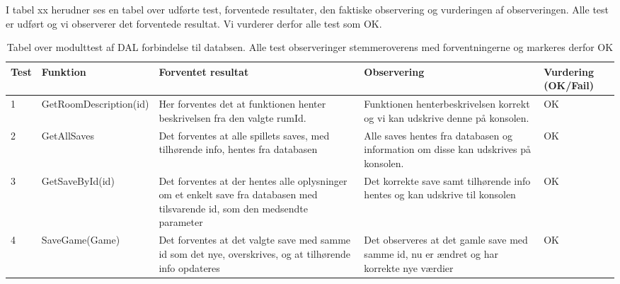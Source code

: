 I tabel xx herudner ses en tabel over udførte test, forventede resultater, den faktiske observering og vurderingen af observeringen.
Alle test er udført og vi observerer det forventede resultat. Vi vurderer derfor alle test som OK.

\begin{table}[H]
\caption{Tabel over modulttest af DAL forbindelse til databsen. Alle test observeringer stemmeroverens med forventningerne og markeres derfor OK }%
\begin{tabular}{|p{0.75cm}|p{3.6cm}|p{3.5cm}|p{3.5cm}|p{1.9cm}|} \hline
 \textbf{Test} & \textbf{Funktion} & \textbf{Forventet resultat} & \textbf{Observering} & \textbf{Vurdering} \textbf{(OK/Fail)}\\\hline
 1 & GetRoomDescription(id) & Her forventes det at funktionen henter beskrivelsen fra den valgte rumId. & Funktionen henterbeskrivelsen korrekt og vi kan udskrive denne på konsolen. & OK \\ \hline
 2 & GetAllSaves & Det forventes at alle spillets saves, med tilhørende info, hentes fra databasen & Alle saves hentes fra databasen og information om disse kan udskrives på konsolen. & OK \\ \hline
 3 & GetSaveById(id) & Det forventes at der hentes alle oplysninger om et enkelt save fra databasen med tilsvarende id, som den medsendte parameter & Det korrekte save samt tilhørende info hentes og kan udskrive til konsolen & OK \\ \hline
 4 & SaveGame(Game) & Det forventes at det valgte save med samme id som det nye, overskrives, og at tilhørende info opdateres & Det observeres at det gamle save med samme id, nu er ændret og har korrekte nye værdier & OK \\ \hline
\end{tabular}
\end{table}

